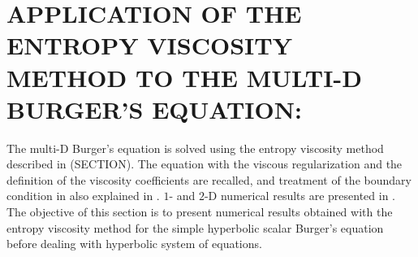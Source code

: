 %
%
%

\chapter{\uppercase {Application of the entropy viscosity method to the multi-D Burger's equation:}}
The multi-D Burger's equation is solved using the entropy viscosity method described in (SECTION). The equation with the viscous regularization and the definition of the viscosity coefficients are recalled, and treatment of the boundary condition in also explained in . $1$- and $2$-D numerical results are presented in . The objective of this section is to present numerical results obtained with the entropy viscosity method for the simple hyperbolic scalar Burger's equation before dealing with hyperbolic system of equations.
